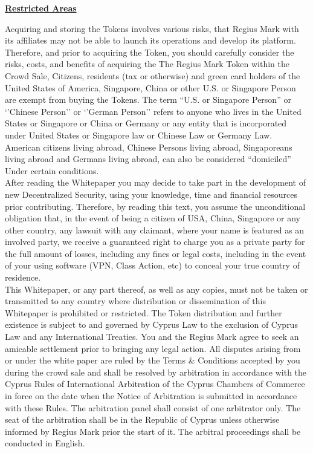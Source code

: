 \documentclass[12pt,a4paper]{article}
\begin{document}
  \begin{center}
    \textbf{\underline{Restricted Areas}}
  \end{center}

  Acquiring and storing the Tokens involves various risks, that Regius Mark with
  its affiliates may not be able to launch its operations and develop its
  platform. Therefore, and prior to acquiring the Token, you should carefully
  consider the risks, costs, and benefits of acquiring the The Regius Mark Token
  within the Crowd Sale, Citizens, residents (tax or otherwise) and green card
  holders of the United States of America, Singapore, China or other U.S. or
  Singapore Person are exempt from buying the Tokens. The term “U.S. or
  Singapore Person” or ‘’Chinese Person’’ or ‘’German Person’’ refers to anyone
  who lives in the United States or Singapore or China or Germany or any entity
  that is incorporated under United States or Singapore law or Chinese Law or
  Germany Law. American citizens living abroad, Chinese Persons living abroad,
  Singaporeans living abroad and Germans living abroad, can also be considered
  “domiciled” Under certain conditions.\\

  After reading the Whitepaper you may decide to take part in the development of
  new Decentralized Security, using your knowledge, time and financial resources
  prior contributing. Therefore, by reading this text, you assume the
  unconditional obligation that, in the event of being a citizen of USA, China,
  Singapore or any other country, any lawsuit with any claimant, where your name
  is featured as an involved party, we receive a guaranteed right to charge you
  as a private party for the full amount of losses, including any fines or legal
  costs, including in the event of your using software (VPN, Class Action, etc)
  to conceal your true country of residence.\\

  This Whitepaper, or any part thereof, as well as any copies, must not be taken
  or transmitted to any country where distribution or dissemination of this
  Whitepaper is prohibited or restricted. The Token distribution and further
  existence is subject to and governed by Cyprus Law to the exclusion of Cyprus
  Law and any International Treaties. You and the Regius Mark agree to seek an
  amicable settlement prior to bringing any legal action. All disputes arising
  from or under the white paper are ruled by the Terms \& Conditions accepted by
  you during the crowd sale and shall be resolved by arbitration in accordance
  with the Cyprus Rules of International Arbitration of the Cyprus Chambers of
  Commerce in force on the date when the Notice of Arbitration is submitted in
  accordance with these Rules. The arbitration panel shall consist of one
  arbitrator only. The seat of the arbitration shall be in the Republic of
  Cyprus unless otherwise informed by Regius Mark prior the start of it. The
  arbitral proceedings shall be conducted in English.
\end{document}

